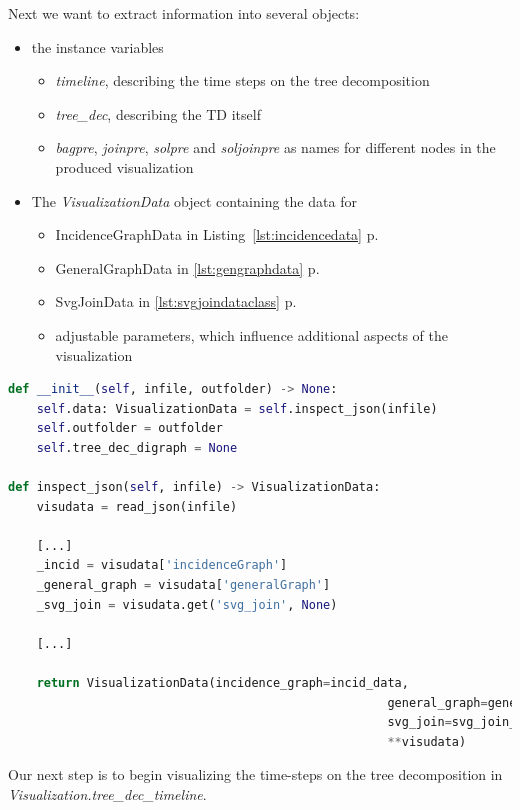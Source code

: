 \documentclass[a4paper, 12pt, bibliography=totoc]{scrartcl}
\begin{document}
Next we want to extract information into several objects: 
\begin{itemize}
	\item the instance variables 
	\begin{itemize}
		\item \textit{timeline}, describing the time steps on the tree decomposition
		\item \textit{tree\_dec}, describing the TD itself
		\item \textit{bagpre}, \textit{joinpre}, \textit{solpre} and \textit{soljoinpre} as names for different nodes in the produced visualization
	\end{itemize}
	\item The \textit{VisualizationData} object containing the data for 
	\begin{itemize}
		\item IncidenceGraphData in Listing~\ref{lst:incidencedata} p. \pageref{lst:incidencedata}
		\item GeneralGraphData in \ref{lst:gengraphdata} p. \pageref{lst:gengraphdata}
		\item SvgJoinData in \ref{lst:svgjoindataclass} p. \pageref{lst:svgjoindataclass}
		\item adjustable parameters, which influence additional aspects of the visualization
	\end{itemize}
\end{itemize}


\begin{lstlisting}[language={Python}, caption={Overview of data initialization}, label={lst:visuinitsmall}]
def __init__(self, infile, outfolder) -> None:
	self.data: VisualizationData = self.inspect_json(infile)
	self.outfolder = outfolder
	self.tree_dec_digraph = None
	
def inspect_json(self, infile) -> VisualizationData:
	visudata = read_json(infile)
	
	[...]
	_incid = visudata['incidenceGraph']
	_general_graph = visudata['generalGraph']
	_svg_join = visudata.get('svg_join', None)
	
	[...]
		
	return VisualizationData(incidence_graph=incid_data,
													 general_graph=general_graph_data,
													 svg_join=svg_join_data,
													 **visudata)
\end{lstlisting}


Our next step is to begin visualizing the time-steps on the tree decomposition in \textit{Visualization.tree\_dec\_timeline}.\\
\end{document}
